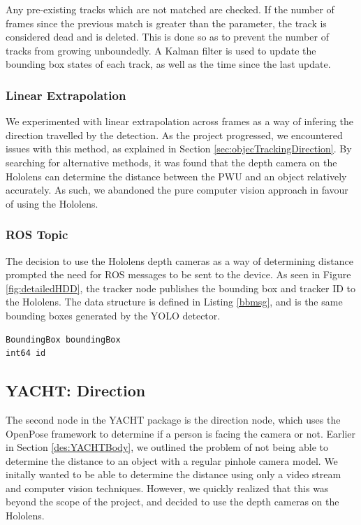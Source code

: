 Any pre-existing tracks which are not matched are checked. If the number of frames since the previous match is greater than the  parameter, the track is considered dead and is deleted. This is done so as to prevent the number of tracks from growing unboundedly. A Kalman filter is used to update the bounding box states of each track, as well as the time since the last update.
 
\subsubsection{Linear Extrapolation}
We experimented with linear extrapolation across frames as a way of infering the direction travelled by the detection. As the project progressed, we encountered issues with this method, as explained in Section \ref{sec:objecTrackingDirection}. By searching for alternative methods, it was found that the depth camera on the Hololens can determine the distance between the PWU and an object relatively accurately. As such, we abandoned the pure computer vision approach in favour of using the Hololens.

\subsubsection{ROS Topic} The decision to use the Hololens depth cameras as a way of determining distance prompted the need for ROS messages to be sent to the device. As seen in Figure \ref{fig:detailedHDD}, the  tracker node publishes the bounding box and tracker ID to the Hololens. The  data structure is defined in Listing \ref{bbmsg}, and is the same bounding boxes generated by the YOLO detector.

\begin{lstlisting}[language=Mymatlab,caption={BoundingBoxID.msg}]
BoundingBox boundingBox
int64 id
\end{lstlisting}

\subsection{YACHT: Direction}
The second node in the YACHT package is the direction node, which uses the OpenPose framework to determine if a person is facing the camera or not. Earlier in Section \ref{des:YACHTBody}, we outlined the problem of not being able to determine the distance to an object with a regular pinhole camera model. We initally wanted to be able to determine the distance using only a video stream and computer vision techniques. However, we quickly realized that this was beyond the scope of the project, and decided to use the depth cameras on the Hololens.

